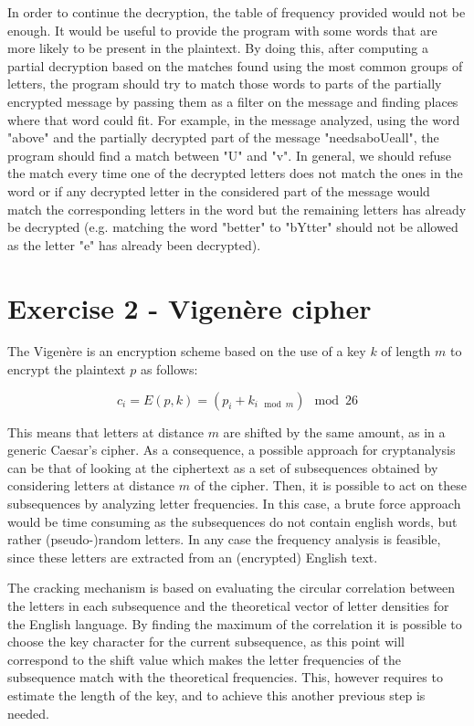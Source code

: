 \documentclass[12pt]{article}
\begin{document}
In order to continue the decryption, the table of frequency provided would not be enough. It would be useful to provide the program with some words that are more likely to be present in the plaintext. By doing this, after computing a partial decryption based on the matches found using the most common groups of letters, the program should try to match those words to parts of the partially encrypted message by passing them as a filter on the message and finding places where that word could fit. For example, in the message analyzed, using the word "above" and the partially decrypted part of the message "needsaboUeall", the program should find a match between "U" and "v". In general, we should refuse the match every time one of the decrypted letters does not match the ones in the word or if any decrypted letter in the considered part of the message would match the corresponding letters in the word but the remaining letters has already be decrypted (e.g. matching the word "better" to "bYtter" should not be allowed as the letter "e" has already been decrypted).


\section{Exercise 2 - Vigenère cipher}

The Vigenère is an encryption scheme based on the use of a key $k$ of length $m$ to encrypt the plaintext $p$ as follows:

\begin{equation*}
  c_i = E(p,k) = (p_i + k_{i\mod{m}})\mod{26}
\end{equation*}

This means that letters at distance $m$ are shifted by the same amount, as in a generic Caesar's cipher.
As a consequence, a possible approach for cryptanalysis can be that of looking at the ciphertext as a set of subsequences obtained by considering letters at distance $m$ of the cipher. 
Then, it is possible to act on these subsequences by analyzing letter frequencies. In this case, a brute force approach would be time consuming as the subsequences do not contain english words, but rather (pseudo-)random letters. 
In any case the frequency analysis is feasible, since these letters are extracted from an (encrypted) English text.

The cracking mechanism is based on evaluating the circular correlation between the letters in each subsequence and the theoretical vector of letter densities for the English language. 
By finding the maximum of the correlation it is possible to choose the key character for the current subsequence, as this point will correspond to the shift value which makes the letter frequencies of the subsequence match with the theoretical frequencies.
This, however requires to estimate the length of the key, and to achieve this another previous step is needed.
\end{document}
